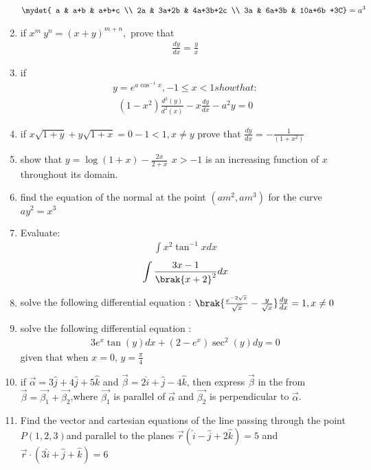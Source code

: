 \documentclass{article}
\begin{document}
\begin{enumerate}
\begin{align*}
\mydet{ a & a+b & a+b+c \\ 2a & 3a+2b & 4a+3b+2c \\ 3a & 6a+3b & 10a+6b +3C} = a^{3} 
\end{align*}
\item if $x^{m} \ y^{n} = (x+y)^{m+n},$ prove that
\begin{align*}
\frac{dy}{dx}=\frac{y}{x} 
\end{align*}
\item if 
\begin{align*}
    y = e^{a \cos^{-1}x}, -1 \leq x < 1  show that :
\end{align*}
\begin{align*}
	(1-x^{2})\frac{d^{2}(y)}{d^{2}(x)} - x \frac{dy}{dx}-a^{2}y=0 
\end{align*}
\item if $ x \sqrt{1+y} + y \sqrt{1+x} = 0 -1 < 1,x \neq y $ prove that $\frac{dy}{dx} = -\frac{1}{(1+x^2)}$
\item show that $ y = \log(1+x)-\frac{2x}{2+x} \, \ x>-1$  is an increasing function of $
x$ throughout its domain.
\item find the equation of the normal at the point $(am^{2},am^{3})$ for the curve $ay^{2} = x^{3}$
\item Evaluate: 
\begin{align*}
	\int x^{2} \tan^{-1}xdx
\end{align*}
\begin{align*}
\int \frac{3x-1}{\brak{x+2}^{2}}dx 
\end{align*}
\item solve the following differential equation : $\brak{\frac{e^{-2\sqrt{x}}}{\sqrt{x}}-\frac{y}{\sqrt{x}}}\frac{dy}{dx}=1, x\neq0$ 
\item solve the following differential equation : 
\begin{align*}
	3e^{x}\tan(y)dx + (2-e^{x})\sec^{2}(y)dy = 0 
\end{align*}
given that when $x=0$, $y=\frac{\pi}{4}$
\item if $\overrightarrow{\alpha} = 3\hat{j}+4\hat{j}+5\hat{k}$ and $\overrightarrow{\beta}=2\hat{i}+\hat{j}-4\hat{k}$, then express $\overrightarrow{\beta}$ in the from $\overrightarrow{\beta}=\overrightarrow{\beta_1}+\overrightarrow{\beta_2}$,where $\overrightarrow{\beta_1}$ is parallel of $\overrightarrow{\alpha}$ and $\overrightarrow{\beta_2}$ is perpendicular to $\overrightarrow{\alpha}$.
\item Find the vector and cartesian equations of the line passing through the point $ P(1, 2, 3) $and parallel to the planes $\vec{r}(\hat{i}-\hat{j}+2\hat{k}) = 5$ and $\vec{r}\cdot(3\hat {i} +\hat{j}+\hat{k})=6$

\end{enumerate}
\end{document}

